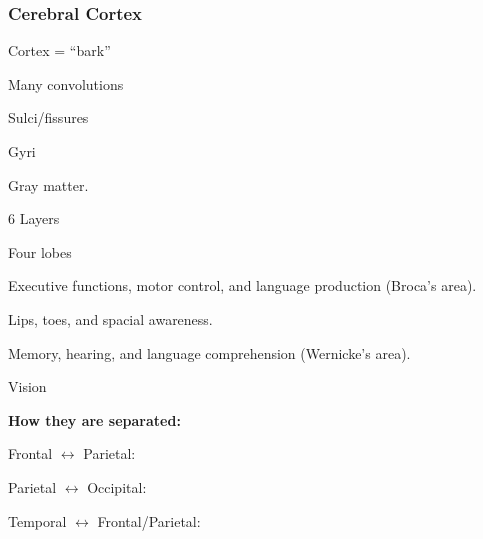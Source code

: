 \subsubsection{Cerebral Cortex}
\begin{coloredlist}
    \item Cortex = ``bark''
    \item Many convolutions
    \begin{coloredlist}
        \item Sulci/fissures
        \item Gyri
    \end{coloredlist}
    \item Gray matter.
    \item 6 Layers
    \item Four lobes
    \begin{coloredlist}
        \item {}
        \begin{coloredlist}
            \item Executive functions, motor control, and language production (Broca's area).
        \end{coloredlist}
        \item {}
        \begin{coloredlist}
            \item Lips, toes, and spacial awareness.
        \end{coloredlist}
        \item {}
        \begin{coloredlist}
            \item Memory, hearing, and language comprehension (Wernicke's area).
        \end{coloredlist}
        \item {}
        \begin{coloredlist}
            \item Vision
        \end{coloredlist}
        \item \textbf{How they are separated:}
        \begin{coloredlist}
            \item Frontal \(\leftrightarrow\) Parietal: 
            \item Parietal \(\leftrightarrow\) Occipital: 
            \item Temporal \(\leftrightarrow\) Frontal/Parietal: 
        \end{coloredlist}
    \end{coloredlist}
    \item {}
\end{coloredlist}




